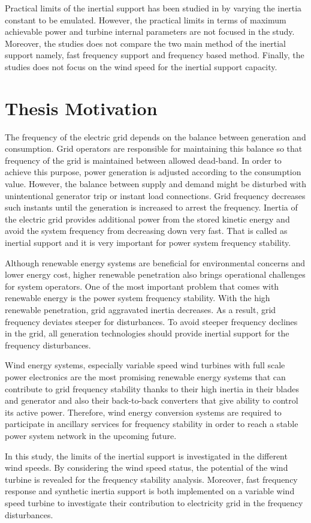 Practical limits of the inertial support has been studied in \cite{Gonzalez-Longatt2016} by varying the inertia constant to be emulated. However, the practical limits in terms of maximum achievable power and turbine internal parameters are not focused in the study. Moreover, the studies does not compare the two main method of the inertial support namely, fast frequency support and frequency based method. Finally, the studies does not focus on the wind speed for the inertial support capacity. 

\section{Thesis Motivation}
The frequency of the electric grid depends on the balance between generation and consumption. Grid operators are responsible for maintaining this balance so that frequency of the grid is maintained between allowed dead-band. In order to achieve this purpose, power generation is adjusted according to the consumption value. However, the balance between supply and demand might be disturbed with unintentional generator trip or instant load connections. Grid frequency decreases such instants until the generation is increased to arrest the frequency. Inertia of the electric grid provides additional power from the stored kinetic energy and avoid the system frequency from decreasing down very fast. That is called as inertial support and it is very important for power system frequency stability.\par
Although renewable energy systems are beneficial for environmental concerns and lower energy cost, higher renewable penetration also brings operational challenges for system operators. One of the most important problem that comes with renewable energy is the power system frequency stability. With the high renewable penetration, grid aggravated inertia decreases. As a result, grid frequency deviates steeper for disturbances. To avoid steeper frequency declines in the grid, all generation technologies should provide inertial support for the frequency disturbances.\par
Wind energy systems, especially variable speed wind turbines with full scale power electronics are the most promising renewable energy systems that can contribute to grid frequency stability thanks to their high inertia in their blades and generator and also their back-to-back converters that give ability to control its active power. Therefore, wind energy conversion systems are required to participate in ancillary services for frequency stability in order to reach a stable power system network in the upcoming future. \par
In this study, the limits of the inertial support is investigated in the different wind speeds. By considering the wind speed status, the potential of the wind turbine is revealed for the frequency stability analysis. Moreover, fast frequency response and synthetic inertia support is both implemented on a variable wind speed turbine to investigate their contribution to electricity grid in the frequency disturbances. 

